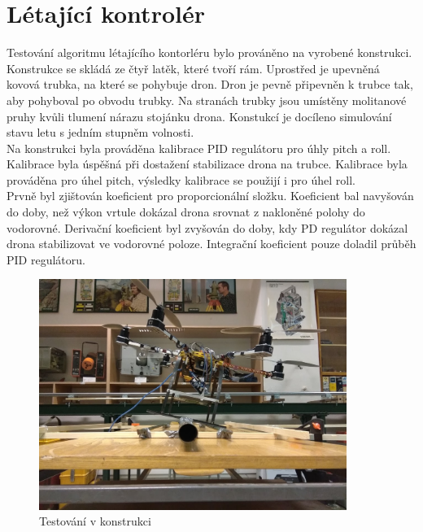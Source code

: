\section{Létající kontrolér}
Testování algoritmu létajícího kontorléru bylo prováněno na vyrobené konstrukci. Konstrukce se skládá ze čtyř latěk, které tvoří rám. Uprostřed je upevněná kovová trubka, na které se pohybuje dron. Dron je pevně připevněn k trubce tak, aby pohyboval po obvodu trubky. Na stranách trubky jsou umístěny molitanové pruhy kvůli tlumení nárazu stojánku drona. Konstukcí je docíleno simulování stavu letu s jedním stupněm volnosti. \\
Na konstrukci byla prováděna kalibrace PID regulátoru pro úhly pitch a roll. Kalibrace byla úspěšná při dostažení stabilizace drona na trubce. Kalibrace byla prováděna pro úhel pitch, výsledky kalibrace se použijí i pro úhel roll.\\
Prvně byl zjištován koeficient pro proporcionální složku. Koeficient bal navyšován do doby, než výkon vrtule dokázal drona srovnat z nakloněné polohy do vodorovné. Derivační koeficient byl zvyšován do doby, kdy PD regulátor dokázal drona stabilizovat ve vodorovné poloze. Integrační koeficient pouze doladil průběh PID regulátoru.\\


\begin{figure}[h]
	\centering
	\includegraphics[width=10cm]{pictures/pidtest.jpg}
	\caption{Testování v konstrukci}
\end{figure}